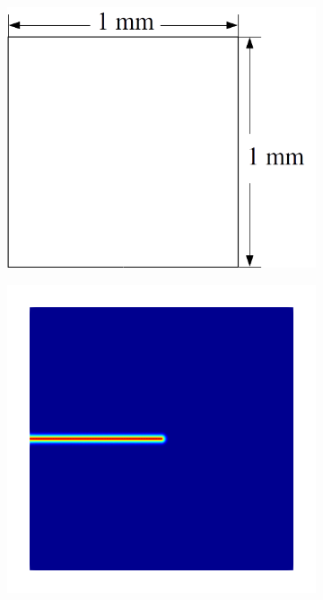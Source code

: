 \begin{figure}[htb!]
  \hspace{0.015\textwidth}
  \begin{subfigure}[b]{0.21\textwidth}
    \centering
    \includegraphics[width=\textwidth,scale=0.5]{Chapter4/figures/intact_plate_dimensions.png}
    \vspace{-0.03\textwidth}
    \caption{}
  \end{subfigure}
  \begin{subfigure}[b]{0.21\textwidth}
    \centering
    \includegraphics[width=\textwidth,scale=0.5]{Chapter4/figures/intact_plate_initial.png}

\end{subfigure}
\end{figure}
